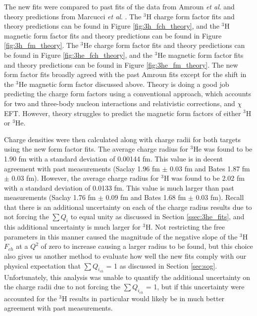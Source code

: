 The new fits were compared to past fits of the data from Amroun \textit{et al}. \cite{Article:Amroun} and theory predictions from Marcucci \textit{et al}. \cite{Article:Marcucci}. The $^3$H charge form factor fits and theory predictions can be found in Figure \ref{fig:3h_fch_theory}, and the $^3$H magnetic form factor fits and theory predictions can be found in Figure \ref{fig:3h_fm_theory}. The $^3$He charge form factor fits and theory predictions can be found in Figure \ref{fig:3he_fch_theory}, and the $^3$He magnetic form factor fits and theory predictions can be found in Figure \ref{fig:3he_fm_theory}. The new form factor fits broadly agreed with the past Amroun fits except for the shift in the $^3$He magnetic form factor discussed above. Theory is doing a good job predicting the charge form factors using a conventional approach, which accounts for two and three-body nucleon interactions and relativistic corrections, and $\chi$EFT. However, theory struggles to predict the magnetic form factors of either $^3$H or $^3$He. 

Charge densities were then calculated along with charge radii for both targets using the new form factor fits. The average charge radius for $^3$He was found to be 1.90 fm with a standard deviation of 0.00144 fm. This value is in decent agreement with past measurements (Saclay 1.96 fm $\pm$ 0.03 fm and Bates 1.87 fm $\pm$ 0.03 fm). However, the average charge radius for $^3$H was found to be 2.02 fm with a standard deviation of 0.0133 fm. This value is much larger than past measurements (Saclay 1.76 fm $\pm$ 0.09 fm and Bates 1.68 fm $\pm$ 0.03 fm). Recall that there is an additional uncertainty on each of the charge radius results due to not forcing the $\sum Q_i$ to equal unity as discussed in Section \ref{ssec:3he_fits}, and this additional uncertainty is much larger for $^3$H. Not restricting the free parameters in this manner caused the magnitude of the negative slope of the $^3$H $F_{ch}$ at a $Q^2$ of zero to increase causing a larger radius to be found, but this choice also gives us another method to evaluate how well the new fits comply with our physical expectation that $\sum Q_{i_{ch}}$ = 1 as discussed in Section \ref{sec:sog}. Unfortunately, this analysis was unable to quantify the additional uncertainty on the charge radii due to not forcing the $\sum Q_{i_{ch}}$ = 1, but if this uncertainty were accounted for the $^3$H results in particular would likely be in much better agreement with past measurements. %

